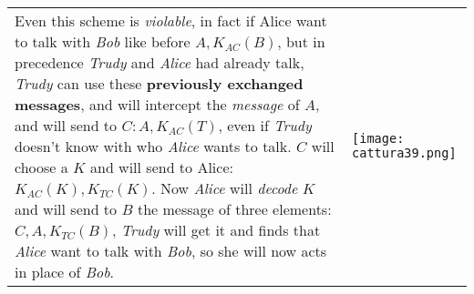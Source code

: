 \documentclass{article}
\begin{document}
\hfill \break \\ 
\begin{tabular}{C{11cm}  L{10.5cm}}
Even this scheme is \emph{violable}, in fact if Alice want to talk with \emph{Bob} like before $A,K_{AC}(B)$, but in precedence \emph{Trudy} and \emph{Alice} had already talk, \emph{Trudy} can use these \textbf{previously exchanged messages}, and will intercept the \emph{message} of $A$, and will send to $C: A,K_{AC}(T)$, even if \emph{Trudy} doesn't know with who \emph{Alice} wants to talk. $C$ will choose a $K$ and will send to Alice: $K_{AC}(K), K_{TC}(K)$. Now \emph{Alice} will \emph{decode} $K$ and will send to $B$ the message of three elements: $C, A, K_{TC}(B)$, \emph{Trudy} will get it and finds that \emph{Alice} want to talk with \emph{Bob}, so she will now acts in place of \emph{Bob}.
& \texttt{[image: cattura39.png]}
\end{tabular}
\end{document}
